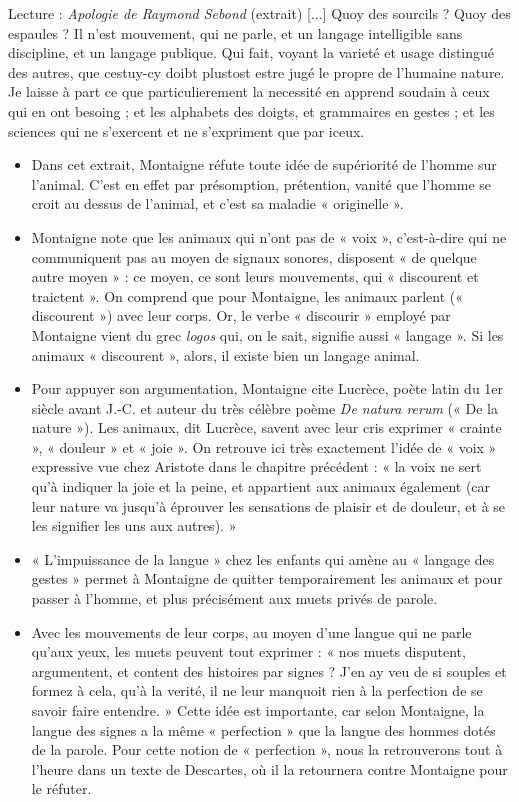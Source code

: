 \begin{lecture}{Lecture : \textit{Apologie de Raymond Sebond} (extrait)}
[...] Quoy des sourcils ? Quoy des espaules ? Il n’est mouvement, qui ne parle, et un langage intelligible sans discipline, et un langage publique. Qui fait, voyant la varieté et usage distingué des autres, que cestuy-cy doibt plustost estre jugé le propre de l’humaine nature. Je laisse à part ce que particulierement la necessité en apprend soudain à ceux qui en ont besoing ; et les alphabets des doigts, et grammaires en gestes ; et les sciences qui ne s’exercent et ne s’expriment que par iceux.
\end{lecture}
\begin{itemize}
\item Dans cet extrait, Montaigne réfute toute idée de supériorité de l’homme sur l’animal. C’est en effet par présomption, prétention, vanité que l’homme se croit au dessus de l’animal, et c’est sa maladie « originelle ».
\item Montaigne note que les animaux qui n’ont pas de « voix », c’est-à-dire qui ne communiquent pas au moyen de signaux sonores, disposent « de quelque autre moyen » : ce moyen, ce sont leurs mouvements, qui « discourent et traictent ». On comprend que pour Montaigne, les animaux parlent (« discourent ») avec leur corps. Or, le verbe « discourir » employé par Montaigne vient du grec \textit{logos} qui, on le sait, signifie aussi « langage ». Si les animaux « discourent », alors, il existe bien un langage animal.
\item Pour appuyer son argumentation, Montaigne cite Lucrèce, poète latin du 1er siècle avant J.-C. et auteur du très célèbre poème \textit{De natura rerum} (« De la nature »). Les animaux, dit Lucrèce, savent avec leur cris exprimer « crainte », « douleur » et « joie ». On retrouve ici très exactement l’idée de « voix » expressive vue chez Aristote dans le chapitre précédent : « la voix ne sert qu’à indiquer la joie et la peine, et appartient aux animaux également (car leur nature va jusqu’à éprouver les sensations de plaisir et de douleur, et à se les signifier les uns aux autres). »
\item « L’impuissance de la langue » chez les enfants qui amène au « langage des gestes » permet à Montaigne de quitter temporairement les animaux et pour passer à l’homme, et plus précisément aux muets privés de parole.
\item Avec les mouvements de leur corps, au moyen d’une langue qui ne parle qu’aux yeux, les muets peuvent tout exprimer : « nos muets disputent, argumentent, et content des histoires par signes ? J’en ay veu de si souples et formez à cela, qu’à la verité, il ne leur manquoit rien à la perfection de se savoir faire entendre. » Cette idée est importante, car selon Montaigne, la langue des signes a la même « perfection » que la langue des hommes dotés de la parole. Pour cette notion de « perfection », nous la retrouverons tout à l’heure dans un texte de Descartes, où il la retournera contre Montaigne pour le réfuter.

\end{itemize}
